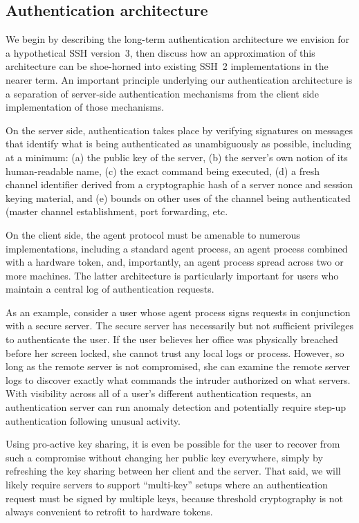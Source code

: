 \documentclass[10pt]{article}
\begin{document}
\subsection{Authentication architecture}
\label{ss:authentication}
We begin by describing the long-term authentication architecture we
envision for a hypothetical SSH version~3, then discuss how an
approximation of this architecture can be shoe-horned into existing
SSH~2 implementations in the nearer term.  An important principle
underlying our authentication architecture is a separation of
server-side authentication mechanisms from the client side
implementation of those mechanisms.

On the server side, authentication takes place by verifying signatures
on messages that identify what is being authenticated as unambiguously
as possible, including at a minimum: (a) the public key of the server,
(b) the server's own notion of its human-readable name, (c) the exact
command being executed, (d) a fresh channel identifier derived from a
cryptographic hash of a server nonce and session keying material, and
(e) bounds on other uses of the channel being authenticated (master
  channel establishment, port forwarding, etc.

On the client side, the agent protocol must be amenable to numerous
implementations, including a standard agent process, an agent process
combined with a hardware token, and, importantly, an agent process
spread across two or more machines.  The latter architecture is
particularly important for users who maintain a central log of
authentication requests.

As an example, consider a user whose agent process signs requests in
conjunction with a secure server.  The secure server has necessarily
but not sufficient privileges to authenticate the user.  If the user
believes her office was physically breached before her screen locked,
she cannot trust any local logs or process.  However, so long as the
remote server is not compromised, she can examine the remote server
logs to discover exactly what commands the intruder authorized on what
servers.  With visibility across all of a user's different
authentication requests, an authentication server can run anomaly
detection and potentially require step-up authentication following
unusual activity.

Using pro-active key sharing, it is even be possible for the user to
recover from such a compromise without changing her public key
everywhere, simply by refreshing the key sharing between her client
and the server.  That said, we will likely require servers to support
``multi-key'' setups where an authentication request must be signed by
multiple keys, because threshold cryptography is not always convenient
to retrofit to hardware tokens.
\end{document}
